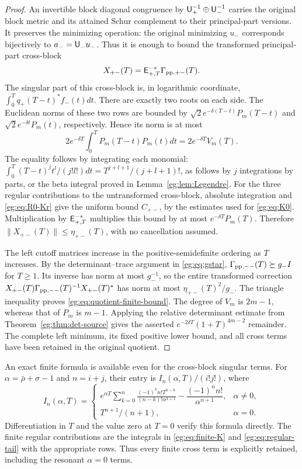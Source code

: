 \documentclass[11pt]{article}
\begin{document}
\begin{proof}
An invertible block diagonal congruence by
$\mathsf U_+^{-1}\oplus\mathsf U_-^{-1}$ carries the original block metric and
its attained Schur complement to their principal-part versions.
It preserves the minimizing operation: the original minimizing
$u_-$ corresponds bijectively to $a_-=\mathsf U_-u_-$. Thus it is enough
to bound the transformed principal-part cross-block
\[
 X_{+-}(T)=\mathsf E_{+,T}^{-*}\Gamma_{{\rm pp},+-}(T).
\]
The singular part of this cross-block is, in logarithmic coordinate,
$\int_0^Tq_+(T-t)^*f_-(t)dt$. There are exactly two roots on
each side. The Euclidean norms of these two rows are bounded by
$\sqrt2e^{-\delta(T-t)}P_m(T-t)$ and
$\sqrt2e^{-\delta t}P_m(t)$, respectively. Hence its norm is at most
\[
 2e^{-\delta T}\int_0^TP_m(T-t)P_m(t)dt
                       =2e^{-\delta T}V_m(T).
\]
The equality follows by integrating each monomial:
$\int_0^T(T-t)^jt^l/(j!l!)dt=T^{j+l+1}/(j+l+1)!$,
as follows by $j$ integrations by parts, or the beta integral
proved in Lemma~\ref{eg:lem:Legendre}.
For the three regular contributions to the untransformed
cross-block, absolute integration and \eqref{eg:eq:R0-Kr} give the
uniform bound $C_{+-}$, by the estimates used for
\eqref{eg:eq:K0}. Multiplication by $\mathsf E_{+,T}^{-*}$ multiplies this
bound by at most $e^{-\delta T}P_m(T)$. Therefore
$\|X_{+-}(T)\|\le\eta_{+-}(T)$, with no cancellation assumed.

The left cutoff matrices increase in the positive-semidefinite
ordering as $T$ increases. By the determinant--trace argument in
\eqref{eg:eq:gstar}, $\Gamma_{\rm pp,--}(T)\succeq g_-I$ for
$T\ge1$. Its inverse has norm at most $g_-^{-1}$, so the entire
transformed correction $X_{+-}(T)\Gamma_{\rm pp,--}(T)^{-1}
X_{+-}(T)^*$ has norm at most $\eta_{+-}(T)^2/g_-$.
The triangle inequality proves \eqref{eg:eq:quotient-finite-bound}.
The degree of $V_m$ is $2m-1$, whereas that of $P_m$ is $m-1$.
Applying the relative determinant estimate from
Theorem~\ref{eg:thm:det-source} gives the asserted
$e^{-2\delta T}(1+T)^{4m-2}$ remainder. The complete left
minimum, its fixed positive lower bound, and all cross terms have
been retained in the original quotient.
\end{proof}

An exact finite formula is available even for the cross-block singular
terms. For $\alpha=\bar\rho+\sigma-1$ and $n=i+j$, their entry is
$I_n(\alpha,T)/(i!j!)$, where
\[
 I_n(\alpha,T)=
 \begin{cases}
 e^{\alpha T}\displaystyle\sum_{k=0}^n
 \frac{(-1)^k n!T^{n-k}}{(n-k)!\alpha^{k+1}}
                  -\dfrac{(-1)^n n!}{\alpha^{n+1}},&\alpha\ne0,\\[4pt]
 T^{n+1}/(n+1),&\alpha=0.
 \end{cases}\tag{EG41}\label{eg:eq:finite-moment}
\]
Differentiation in $T$ and the value zero at $T=0$ verify this
formula directly. The finite regular contributions are the integrals
in \eqref{eg:eq:finite-K} and \eqref{eg:eq:regular-tail} with the appropriate
rows. Thus every finite cross term is explicitly retained, including
the resonant $\alpha=0$ terms.
\end{document}
